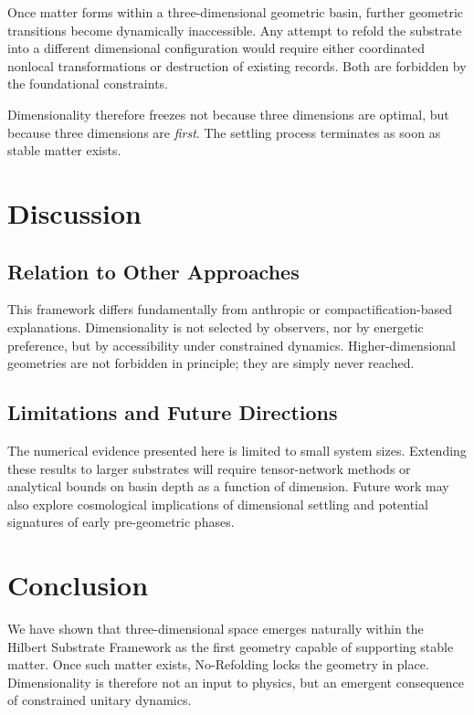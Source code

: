 \documentclass[11pt]{article}
\begin{document}
Once matter forms within a three-dimensional geometric basin, further geometric transitions become dynamically inaccessible. Any attempt to refold the substrate into a different dimensional configuration would require either coordinated nonlocal transformations or destruction of existing records. Both are forbidden by the foundational constraints.

Dimensionality therefore freezes not because three dimensions are optimal, but because three dimensions are \emph{first}. The settling process terminates as soon as stable matter exists.

\section{Discussion}

\subsection{Relation to Other Approaches}

This framework differs fundamentally from anthropic or compactification-based explanations. Dimensionality is not selected by observers, nor by energetic preference, but by accessibility under constrained dynamics. Higher-dimensional geometries are not forbidden in principle; they are simply never reached.

\subsection{Limitations and Future Directions}

The numerical evidence presented here is limited to small system sizes. Extending these results to larger substrates will require tensor-network methods or analytical bounds on basin depth as a function of dimension. Future work may also explore cosmological implications of dimensional settling and potential signatures of early pre-geometric phases.

\section{Conclusion}

We have shown that three-dimensional space emerges naturally within the Hilbert Substrate Framework as the first geometry capable of supporting stable matter. Once such matter exists, No-Refolding locks the geometry in place. Dimensionality is therefore not an input to physics, but an emergent consequence of constrained unitary dynamics.
\end{document}
